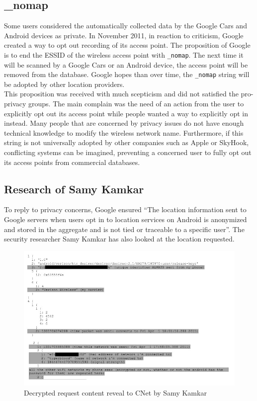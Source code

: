 \subsection{\_nomap}

Some users considered the automatically collected data by the Google Cars and Android devices as private.
In November 2011, in reaction to criticism, Google created a way to opt out recording of its access point.
The proposition of Google is to end the ESSID of the wireless access point with \texttt{\_nomap}.
The next time it will be scanned by a Google Cars or an Android device, the access point will be removed from the database.
Google hopes than over time, the \texttt{\_nomap} string will be adopted by other location providers\cite{nomap}.\\

This proposition was received with much scepticism and did not satisfied the pro-privacy groups.
The main complain was the need of an action from the user to explicitly opt out its access point while people wanted a way to explicitly opt in instead.
Many people that are concerned by privacy issues do not have enough technical knowledge to modify the wireless network name.
Furthermore, if this string is not universally adopted by other companies such as Apple or SkyHook, conflicting systems can be imagined, preventing a concerned user to fully opt out its access points from commercial databases.

\subsection{Research of Samy Kamkar}

To reply to privacy concerns, Google ensured ``The location information sent to Google servers when users opt in to location services on Android is anonymized and stored in the aggregate and is not tied or traceable to a specific user''\cite{loc-not-traceable}.
The security researcher Samy Kamkar has also looked at the location requested.\\

\begin{figure}[h]
  \hspace*{-2cm}
  \centering
  \includegraphics[width=18cm]{images/reqdecode.jpg}
  \caption{Decrypted request content reveal to CNet by Samy Kamkar}
  \label{fig:reqdecode}
\end{figure}

